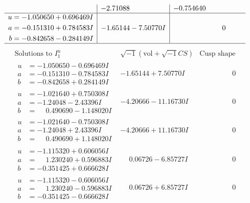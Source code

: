 \documentclass[1p]{elsarticle_modified}
\theoremstyle{definition}
\newcommand{\I}{\sqrt{-1}}
\begin{document}
$$\begin{array}{c|c|c}
 & -2.71088\phantom{ +0.000000I} & -0.754640\phantom{ +0.000000I} \\ \hline\begin{aligned}
u &= -1.050650 + 0.696469 I \\
a &= -0.151310 + 0.784583 I \\
b &= -0.842658 - 0.284149 I\end{aligned}
 & -1.65144 - 7.50770 I & \phantom{-0.000000 } 0\\
 \hline 
 \end{array}$$\newpage$$\begin{array}{c|c|c}  
\text{Solutions to }I^u_{1}& \I (\text{vol} + \sqrt{-1}CS) & \text{Cusp shape}\\
 \hline 
\begin{aligned}
u &= -1.050650 - 0.696469 I \\
a &= -0.151310 - 0.784583 I \\
b &= -0.842658 + 0.284149 I\end{aligned}
 & -1.65144 + 7.50770 I & \phantom{-0.000000 } 0 \\ \hline\begin{aligned}
u &= -1.021640 + 0.750308 I \\
a &= -1.24048 - 2.43396 I \\
b &= \phantom{-}0.490690 - 1.148020 I\end{aligned}
 & -4.20666 - 11.16730 I & \phantom{-0.000000 } 0 \\ \hline\begin{aligned}
u &= -1.021640 - 0.750308 I \\
a &= -1.24048 + 2.43396 I \\
b &= \phantom{-}0.490690 + 1.148020 I\end{aligned}
 & -4.20666 + 11.16730 I & \phantom{-0.000000 } 0 \\ \hline\begin{aligned}
u &= -1.115320 + 0.606056 I \\
a &= \phantom{-}1.230240 + 0.596883 I \\
b &= -0.351425 + 0.666628 I\end{aligned}
 & \phantom{-}0.06726 - 6.85727 I & \phantom{-0.000000 } 0 \\ \hline\begin{aligned}
u &= -1.115320 - 0.606056 I \\
a &= \phantom{-}1.230240 - 0.596883 I \\
b &= -0.351425 - 0.666628 I\end{aligned}
 & \phantom{-}0.06726 + 6.85727 I & \phantom{-0.000000 } 0 \\ \hline\begin{aligned}

\end{aligned}
\end{array}$$
\end{document}
